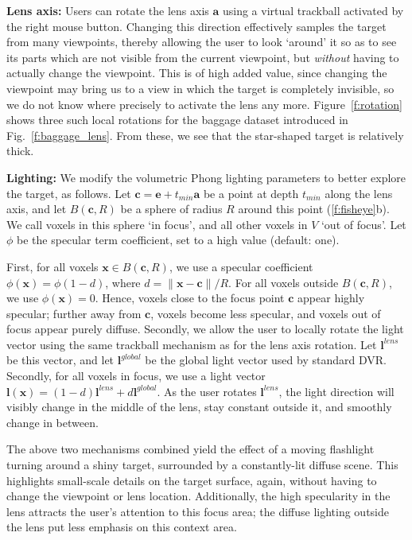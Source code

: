 \vspace{0.2cm}
\noindent\textbf{Lens axis:} Users can rotate the lens axis $\mathbf{a}$ using a virtual trackball activated by the right mouse button. Changing this direction effectively samples the target from many viewpoints, thereby allowing the user to look `around' it so as to see its parts which are not visible from the current viewpoint, but \emph{without} having to actually change the viewpoint. This is of high added value, since changing the viewpoint may bring us to a view in which the target is completely invisible, so we do not know where precisely to activate the lens any more. Figure~\ref{f:rotation} shows three such local rotations for the baggage dataset introduced in Fig.~\ref{f:baggage_lens}. From these, we see that the star-shaped target is relatively thick.

\vspace{0.2cm}
\noindent\textbf{Lighting:} We modify the volumetric Phong lighting parameters to better explore the target, as follows. Let $\mathbf{c} = \mathbf{e} + t_{min}\mathbf{a}$ be a point at depth $t_{min}$ along the lens axis, and let $B(\mathbf{c},R)$ be a sphere of radius $R$ around this point (\autoref{f:fisheye}b). We call voxels in this sphere `in focus', and all other voxels in $V$ `out of focus'. Let $\phi$ be the specular term coefficient, set to a high value (default: one).

First, for all voxels $\mathbf{x} \in B(\mathbf{c},R)$, we use a specular coefficient $\phi(\mathbf{x}) = \phi (1-d)$, where $d=\|\mathbf{x}-\mathbf{c}\|/R$. For all voxels outside $B(\mathbf{c},R)$, we use $\phi(\mathbf{x}) = 0$. Hence, voxels close to the focus point $\mathbf{c}$ appear highly specular; further away from $\mathbf{c}$, voxels become less specular, and voxels out of focus appear purely diffuse. Secondly, we allow the user to locally rotate the light vector using the same trackball mechanism as for the lens axis rotation. Let $\mathbf{l}^{lens}$ be this vector, and let $\mathbf{l}^{global}$ be the global light vector used by standard DVR. Secondly, for all voxels in focus, we use a light vector $\mathbf{l}(\mathbf{x}) = (1 - d)\mathbf{l}^{lens} + d\mathbf{l}^{global}$. As the user rotates $\mathbf{l}^{lens}$, the light direction will visibly change in the middle of the lens, stay constant outside it, and smoothly change in between.

The above two mechanisms combined yield the effect of a moving flashlight turning around a shiny target, surrounded by a constantly-lit diffuse scene. This highlights small-scale details on the target surface, again, without having to change the viewpoint or lens location. Additionally, the high specularity in the lens attracts the user's attention to this focus area; the diffuse lighting outside the lens put less emphasis on this context area.

